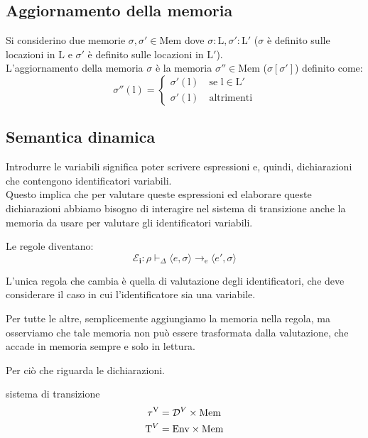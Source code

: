 \subsection{Aggiornamento della memoria}
Si considerino due memorie $\sigma, \sigma' \in \mathrm{Mem}$ dove $\sigma : \mathrm{L}, \sigma' : \mathrm{L}'$ ($\sigma$ è definito sulle locazioni in $\mathrm{L}$ e $\sigma'$ è definito sulle locazioni in $\mathrm{L}'$).\\[0.2ex]
L'aggiornamento della memoria $\sigma$ è la memoria $\sigma'' \in \mathrm{Mem}$ ($\sigma[\sigma']$) definito come:
\[
    \sigma''(\mathrm{l}) =
    \begin{cases}
        \sigma'(\mathrm{l}) \quad \text{se } \mathrm{l \in L'}\\
        \sigma'(\mathrm{l}) \quad \text{altrimenti}
    \end{cases}
\]

\subsection{Semantica dinamica}
Introdurre le variabili significa poter scrivere espressioni e, quindi, dichiarazioni che contengono identificatori variabili.\\[0.2ex]
Questo implica che per valutare queste espressioni ed elaborare queste dichiarazioni abbiamo bisogno di interagire nel sistema di transizione anche la memoria da usare per valutare gli identificatori variabili.

Le regole diventano:
\[
    \mathcal{E}_\mathbf{i} : \rho \vdash_\Delta \langle e, \sigma \rangle \to_\mathrm{e} \langle e', \sigma \rangle
\]

L'unica regola che cambia è quella di valutazione degli identificatori, che deve considerare il caso in cui l'identificatore sia una variabile.


Per tutte le altre, semplicemente aggiungiamo la memoria nella regola, ma osserviamo che tale memoria non può essere trasformata dalla valutazione, che accade in memoria sempre e solo in lettura.

\medskip
Per ciò che riguarda le dichiarazioni.

\begin{mydef}{sistema di transizione}
    \[
        \begin{aligned}
            \tau^\mathrm{V} &= \mathcal{D}^\mathnormal{V} \times \mathrm{Mem}\\
            \mathrm{T}^\mathnormal{V} &= \mathrm{Env} \times \mathrm{Mem}
        \end{aligned}
    \]
\end{mydef}

